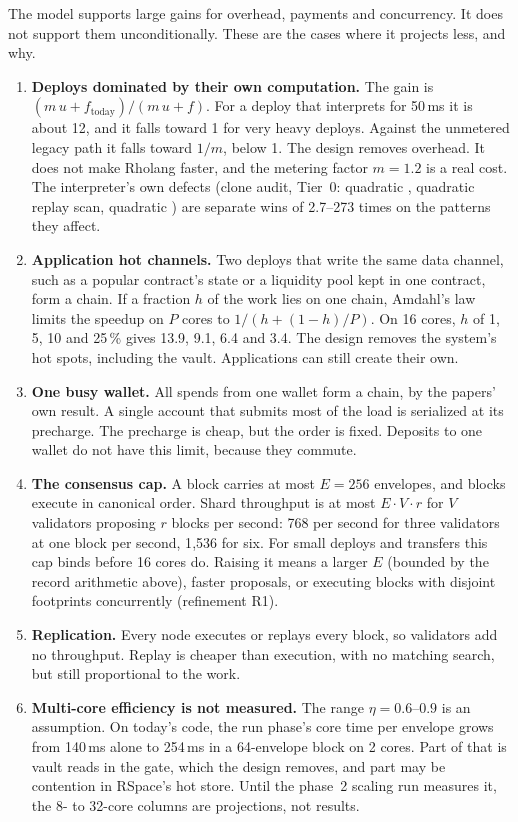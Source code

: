 \documentclass[11pt]{article}
\newcommand{\code}{\path}
\begin{document}
The model supports large gains for overhead, payments and concurrency. It does not support them unconditionally. These are the cases where it projects less, and why.

\begin{enumerate}
\item \textbf{Deploys dominated by their own computation.} The gain is $(m\,u + f_{\mathrm{today}})/(m\,u + f)$. For a deploy that interprets for 50\,ms it is about 12, and it falls toward 1 for very heavy deploys. Against the unmetered legacy path it falls toward $1/m$, below 1. The design removes overhead. It does not make Rholang faster, and the metering factor $m = 1.2$ is a real cost. The interpreter's own defects (clone audit, Tier~0: quadratic \code{Env::put}, quadratic replay scan, quadratic \code{eval_match}) are separate wins of 2.7--273 times on the patterns they affect.
\item \textbf{Application hot channels.} Two deploys that write the same data channel, such as a popular contract's state or a liquidity pool kept in one contract, form a chain. If a fraction $h$ of the work lies on one chain, Amdahl's law limits the speedup on $P$ cores to $1/(h + (1-h)/P)$. On 16 cores, $h$ of 1, 5, 10 and 25\,\% gives 13.9, 9.1, 6.4 and 3.4. The design removes the system's hot spots, including the vault. Applications can still create their own.
\item \textbf{One busy wallet.} All spends from one wallet form a chain, by the papers' own result. A single account that submits most of the load is serialized at its precharge. The precharge is cheap, but the order is fixed. Deposits to one wallet do not have this limit, because they commute.
\item \textbf{The consensus cap.} A block carries at most $E = 256$ envelopes, and blocks execute in canonical order. Shard throughput is at most $E \cdot V \cdot r$ for $V$ validators proposing $r$ blocks per second: 768 per second for three validators at one block per second, 1{,}536 for six. For small deploys and transfers this cap binds before 16 cores do. Raising it means a larger $E$ (bounded by the record arithmetic above), faster proposals, or executing blocks with disjoint footprints concurrently (refinement R1).
\item \textbf{Replication.} Every node executes or replays every block, so validators add no throughput. Replay is cheaper than execution, with no matching search, but still proportional to the work.
\item \textbf{Multi-core efficiency is not measured.} The range $\eta = 0.6$--$0.9$ is an assumption. On today's code, the run phase's core time per envelope grows from 140\,ms alone to 254\,ms in a 64-envelope block on 2 cores. Part of that is vault reads in the gate, which the design removes, and part may be contention in RSpace's hot store. Until the phase~2 scaling run measures it, the 8- to 32-core columns are projections, not results.

\end{enumerate}
\end{document}

